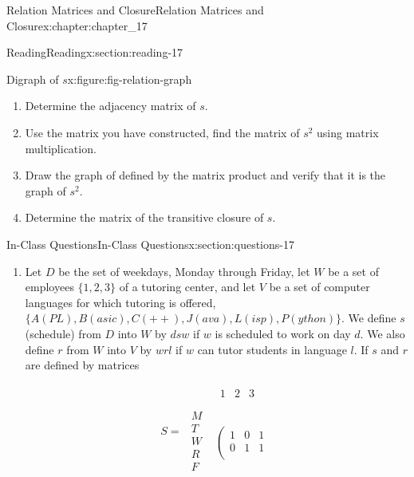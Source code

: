 \documentclass[oneside,10pt,]{book}
\numberwithin{equation}{section}
\begin{document}
\begin{chapterptx}{Relation Matrices and Closure}{}{Relation Matrices and Closure}{}{}{x:chapter:chapter_17}
\begin{sectionptx}{Reading}{}{Reading}{}{}{x:section:reading-17}
\begin{figureptx}{Digraph of \(s\)}{x:figure:fig-relation-graph}{}
\begin{image}{0.25}{0.5}{0.25}
\end{image}%
\tcblower
\end{figureptx}%
%
\begin{enumerate}[label=(\alph*)]
\item{}Determine the adjacency matrix of \(s\).%
\item{}Use the matrix you have constructed, find the matrix of \(s^2\) using matrix multiplication.%
\item{}Draw the graph of defined by the matrix product and verify that it is the graph of \(s^2\).%
\item{}Determine the matrix of the transitive closure of \(s\).%
\end{enumerate}
%
\end{sectionptx}
%
%
\typeout{************************************************}
\typeout{************************************************}
%
\begin{sectionptx}{In-Class Questions}{}{In-Class Questions}{}{}{x:section:questions-17}
%
\begin{enumerate}[label=\arabic*.]
\item{}Let \(D\) be the set of weekdays, Monday through Friday, let \(W\) be a set of employees \(\{1, 2, 3\}\) of a tutoring center, and let \(V\) be a set of computer languages for which tutoring is offered,  \(\{A(PL), B(asic), C(++), J(ava), L(isp), P(ython)\}\). We define \(s\) (schedule) from \(D\) into \(W\) by \(d s w\) if \(w\) is scheduled to work on day \(d\). We also define \(r\) from \(W\) into \(V\) by \(w r l\) if \(w\) can tutor students in language \(l\). If \(s\) and \(r\) are defined by matrices%
\par
%
\begin{equation*}
S = 
\begin{array}{cc}
& 
\begin{array}{ccc}
1 & 2 & 3 \\
\end{array}
\\
\begin{array}{c}
M \\
T \\
W \\
R \\
F \\
\end{array}
& 
\left(
\begin{array}{ccc}
1 & 0 & 1 \\
0 & 1 & 1 \\

\end{array}
\end{array}
\end{equation*}
\end{enumerate}
\end{sectionptx}
\end{chapterptx}
\end{document}
